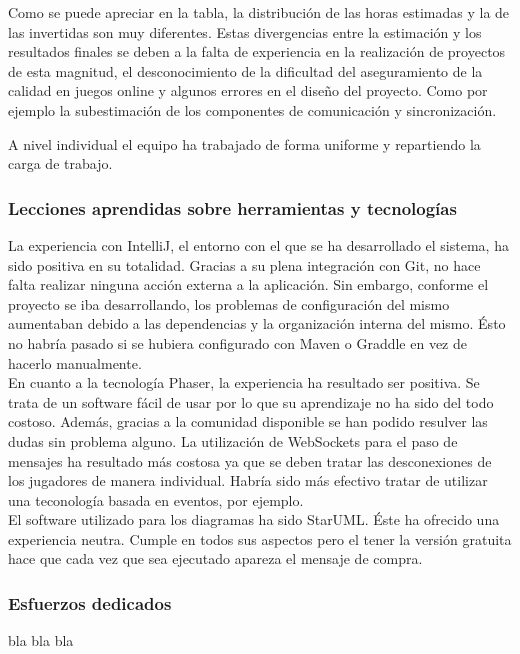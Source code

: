 Como se puede apreciar en la tabla, la distribución de las horas estimadas y la de las invertidas son muy diferentes. Estas divergencias entre la estimación y los resultados finales se deben a la falta de experiencia en la realización de proyectos de esta magnitud, el desconocimiento de la dificultad del aseguramiento de la calidad en juegos online y algunos errores en el diseño del proyecto. Como por ejemplo la subestimación de los componentes de comunicación y sincronización.

A nivel individual el equipo ha trabajado de forma uniforme y repartiendo la carga de trabajo. 


\subsubsection{Lecciones aprendidas sobre herramientas y tecnologías}
La experiencia con IntelliJ, el entorno con el que se ha desarrollado el sistema, ha sido positiva en su totalidad. Gracias a su plena integración con Git, no hace falta realizar ninguna acción externa a la aplicación. Sin embargo, conforme el proyecto se iba desarrollando, los problemas de configuración del mismo aumentaban debido a las dependencias y la organización interna del mismo. Ésto no habría pasado si se hubiera configurado con Maven o Graddle en vez de hacerlo manualmente.
\\
En cuanto a la tecnología Phaser, la experiencia ha resultado ser positiva. Se trata de un software fácil de usar por lo que su aprendizaje no ha sido del todo costoso. Además, gracias a la comunidad disponible se han podido resulver las dudas sin problema alguno. La utilización de WebSockets para el paso de mensajes ha resultado más costosa ya que se deben tratar las desconexiones de los jugadores de manera individual. Habría sido más efectivo tratar de utilizar una teconología basada en eventos, por ejemplo.
\\
El software utilizado para los diagramas ha sido StarUML. Éste ha ofrecido una experiencia neutra. Cumple en todos sus aspectos pero el tener la versión gratuita hace que cada vez que sea ejecutado apareza el mensaje de compra.
\subsubsection{Esfuerzos dedicados}
bla bla bla
